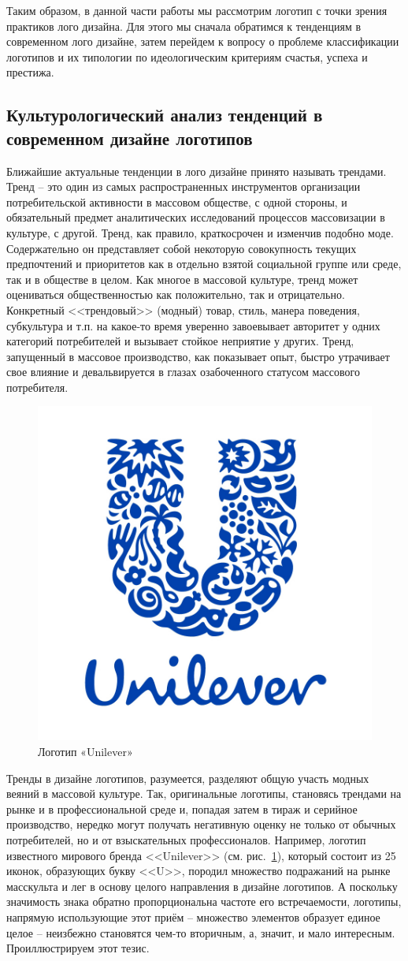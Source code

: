 Таким образом, в данной части работы мы рассмотрим логотип с точки зрения практиков лого
дизайна. Для этого мы сначала обратимся к тенденциям в современном лого дизайне, затем перейдем к
вопросу о проблеме классификации логотипов и их типологии по идеологическим критериям счастья,
успеха и престижа.

\subsection{Культурологический анализ тенденций в современном дизайне логотипов}
Ближайшие актуальные тенденции в лого дизайне принято называть трендами. Тренд -- это один из самых распространенных инструментов организации потребительской активности в массовом обществе, с одной стороны, и обязательный предмет аналитических исследований процессов массовизации в культуре, с другой. Тренд, как правило, краткосрочен и изменчив подобно моде. Содержательно он представляет собой некоторую совокупность текущих предпочтений и приоритетов как в отдельно взятой социальной группе или среде, так и в обществе в целом. Как многое в массовой культуре, тренд может оцениваться общественностью как положительно, так и отрицательно. Конкретный <<трендовый>> (модный) товар, стиль, манера поведения, субкультура и т.п. на какое-то время уверенно завоевывает авторитет у одних категорий потребителей и вызывает стойкое неприятие у других. Тренд, запущенный в массовое производство, как показывает опыт, быстро утрачивает свое влияние и девальвируется в глазах озабоченного статусом массового потребителя.

\begin{figure}
  \centering
  \includegraphics[width=.3\linewidth]{images/unilever}
  \caption{Логотип «Unilever»}
  \label{fig:unilever}
\end{figure}

Тренды в дизайне логотипов, разумеется, разделяют общую участь модных веяний в массовой культуре. Так, оригинальные логотипы, становясь трендами на рынке и в профессиональной среде и, попадая затем в тираж и серийное производство, нередко могут получать негативную оценку не только от обычных потребителей, но и от взыскательных профессионалов. Например, логотип известного мирового бренда <<Unilever>> (см. рис.~\ref{fig:unilever}), который состоит из 25 иконок, образующих букву <<U>>, породил множество подражаний на рынке масскульта и лег в основу целого направления в дизайне логотипов. А поскольку значимость знака обратно пропорциональна частоте его встречаемости, логотипы, напрямую использующие этот приём -- множество элементов образует единое целое -- неизбежно становятся чем-то вторичным, а, значит, и мало интересным. Проиллюстрируем этот тезис.

